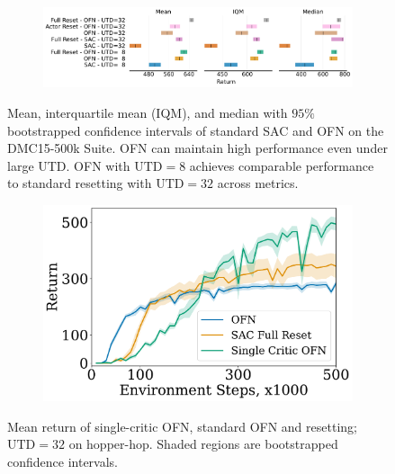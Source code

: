 \begin{figure}[t]
\begin{minipage}[b]{0.67\textwidth}
\centering
    \begin{subfigure}[b]{\textwidth}
        \centering
        \includegraphics[width=10.2cm]{figures/dissecting/main_exp/all_aggregate_scores.pdf}
    \end{subfigure}%
    \caption{Mean, interquartile mean (IQM), and median with $95\%$ bootstrapped confidence intervals of standard SAC and OFN on the DMC15-500k Suite. OFN can maintain high performance even under large UTD. OFN with $\mathrm{UTD} = 8$ achieves comparable performance to standard resetting with $\mathrm{UTD} = 32$ across metrics.}
    \label{fig:overestimation:aggregate}
\end{minipage}
\hfill
\begin{minipage}[b]{.3\textwidth}
\centering
    \begin{subfigure}[b]{\textwidth}
        \centering
        \includegraphics[width=\textwidth]{figures/dissecting/main_exp/hopper_hop_wl.pdf}
    \end{subfigure}%
    \caption{Mean return of single-critic OFN, standard OFN and resetting; $\mathrm{UTD}=32$ on hopper-hop. Shaded regions are bootstrapped confidence intervals.}
    \label{fig:overestimation:hopper_hop}
\end{minipage}
\end{figure}



